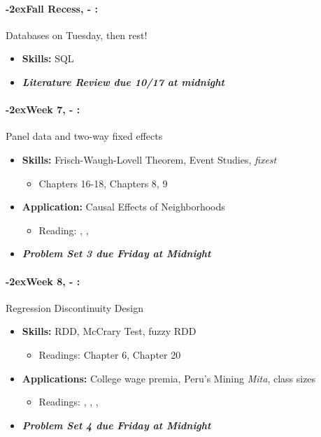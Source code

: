 \documentclass[11pt]{article}
\newcommand{\week}[1]{%
  \paragraph*{\kern-2ex\quad #1, \AdvanceDate[1]\syldate{\today} - \AdvanceDate[2]\syldate{\today}:}%
  \ifdim\wd1=\wd\MONDAY
    \AdvanceDate[7]
  \else
    \AdvanceDate[7]
  \fi%
}
\begin{document}
\week{Fall Recess} Databases on Tuesday, then rest!
\begin{itemize}
  \item \textbf{Skills:} SQL
  \item \textit{\textbf{Literature Review due 10/17 at midnight}}
\end{itemize}
\week{Week 7} Panel data and two-way fixed effects
\begin{itemize}
  \item \textbf{Skills:} Frisch-Waugh-Lovell Theorem, Event Studies, \textit{fixest}
  \begin{itemize}
    \item \cite{hungtintonklein2023effect} Chapters 16-18, \cite{cunningham2023mixtape} Chapters 8, 9
  \end{itemize}
  \item \textbf{Application:} Causal Effects of Neighborhoods
  \begin{itemize}
    \item Reading: \textbf{\cite{chetty2018neighborhoods}}, \textbf{\cite{chetty2019moving}}, \textbf{\cite{chetty2016moving}}
  \end{itemize}
  \item \textit{\textbf{Problem Set 3 due Friday at Midnight}}
\end{itemize}
\week{Week 8} Regression Discontinuity Design
\begin{itemize}
  \item \textbf{Skills:} RDD, McCrary Test, fuzzy RDD
  \begin{itemize}
    \item Readings: \cite{cunningham2023mixtape} Chapter 6, \cite{hungtintonklein2023effect} Chapter 20
  \end{itemize}
  \item \textbf{Applications:} College wage premia, Peru's Mining \textit{Mita}, class sizes
  \begin{itemize}
    \item Readings: \textbf{\cite{dell2010mita}}, \textbf{\cite{zimmerman2014returns}}, \textbf{\cite{angrist1999maimonides}}, \cite{chetty2023diversifying}
  \end{itemize}
  \item \textit{\textbf{Problem Set 4 due Friday at Midnight}}
\end{itemize}
\end{document}
